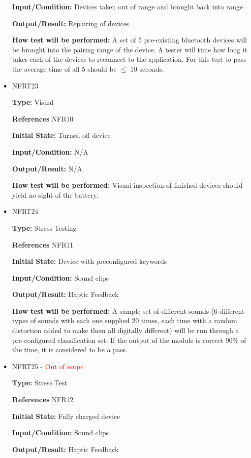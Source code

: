 \documentclass[12pt, titlepage]{article}
\begin{document}
\begin{itemize}
\textbf{Input/Condition:} Devices taken out of range and brought back into range
					
\textbf{Output/Result:} Repairing of devices
					
\textbf{How test will be performed:} A set of 5 pre-existing bluetooth devices will be brought into the pairing range of the device. A tester will time how long it takes each of the devices to reconnect to the application. For this test to pass the average time of all 5 should be $\leq$ 10 seconds.

\item{NFRT23}

\textbf{Type:} Visual

\textbf{References} NFR10
					
\textbf{Initial State:} Turned off device
					
\textbf{Input/Condition:} N/A
					
\textbf{Output/Result:} N/A
					
\textbf{How test will be performed:} Visual inspection of finished devices should yield no sight of the battery.

\item{NFRT24}

\textbf{Type:} Stress Testing

\textbf{References} NFR11
					
\textbf{Initial State:} Device with preconfigured keywords 
					
\textbf{Input/Condition:} Sound clips
					
\textbf{Output/Result:} Haptic Feedback
					
\textbf{How test will be performed:} A sample set of different sounds (6 different types of sounds with each one supplied 20 times, each time with a random distortion added to make them all digitally different) will be run through a pre-configured classification set. If the output of the module is correct 90\% of the time, it is considered to be a pass.

\item{NFRT25 - \textcolor{red}{Out of scope}}

\textbf{Type:} Stress Test

\textbf{References} NFR12
					
\textbf{Initial State:} Fully charged device
					
\textbf{Input/Condition:} Sound clips
					
\textbf{Output/Result:} Haptic Feedback
					

\end{itemize}
\end{document}
